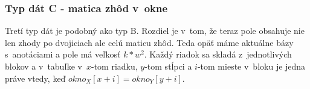 
\subsubsection{Typ dát C - matica zhôd v~okne}

Tretí typ dát je podobný ako typ B. Rozdiel je v~tom, že teraz pole obsahuje nie len zhody po dvojiciach ale celú maticu zhôd. Teda opäť máme aktuálne bázy s~anotáciami a pole má veľkosť $k*w^2$. Každý riadok sa skladá z~jednotlivých blokov a v~tabuľke v~$x$-tom riadku, $y$-tom stĺpci a $i$-tom mieste v~bloku je jedna práve
vtedy, keď $okno_X[x+i] = okno_Y[y+i]$.


